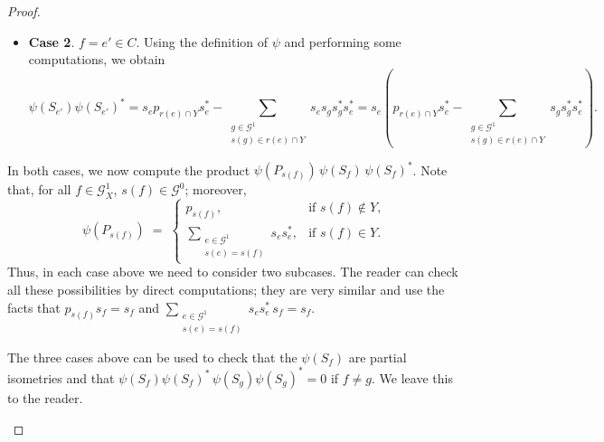 \documentclass[10pt,a4paper]{amsart}
\begin{document}
\begin{proof}
\begin{enumerate}
\begin{itemize}
\item \textbf{Case 2}. $f = e' \in C$. Using the definition of $\psi$ and performing some computations, we obtain
\[
\psi(S_{e'})\psi(S_{e'})^*
=
s_e p_{r(e) \cap Y} s_e^*
-
\sum_{\substack{g \in \mathcal{G}^1 \\ s(g) \in r(e) \cap Y}} s_e s_g s_g^* s_e^*
=
s_e \!\left(
p_{r(e) \cap Y} s_e^*
-
\sum_{\substack{g \in \mathcal{G}^1 \\ s(g) \in r(e) \cap Y}} s_g s_g^* s_e^*
\right)\!.
\]
\end{itemize}

In both cases, we now compute the product $\psi(P_{s(f)})\,\psi(S_f)\,\psi(S_f)^*$. Note that, for all $f \in \mathcal{G}_X^1$,
$s(f) \in \mathcal{G}^0$; moreover,
\[
\psi(P_{s(f)}) \;=\;
\begin{cases}
p_{s(f)}, & \text{if } s(f) \notin Y, \\[2pt]
\displaystyle \sum_{\substack{e \in \mathcal{G}^1 \\ s(e) = s(f)}} s_e s_e^*, & \text{if } s(f) \in Y.
\end{cases}
\]
Thus, in each case above we need to consider two subcases. The reader can check all these
possibilities by direct computations; they are very similar and use the facts that
$p_{s(f)} s_f = s_f$ and
$\sum_{\substack{e \in \mathcal{G}^1 \\ s(e) = s(f)}} s_e s_e^*\, s_f = s_f$.

The three cases above can be used to check that the $\psi(S_f)$ are partial isometries and that
$\psi(S_f) \psi(S_f)^* \, \psi(S_g) \psi(S_g)^* = 0$ if $f \neq g$. We leave this to the reader.


\end{enumerate}
\end{proof}
\end{document}
